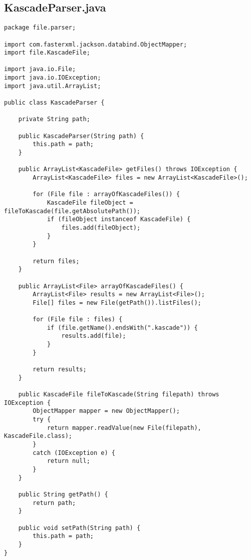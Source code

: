 \documentclass{acm_proc_article-sp}
\begin{document}
\subsection{KascadeParser.java}
\begin{lstlisting}
package file.parser;

import com.fasterxml.jackson.databind.ObjectMapper;
import file.KascadeFile;

import java.io.File;
import java.io.IOException;
import java.util.ArrayList;

public class KascadeParser {

    private String path;

    public KascadeParser(String path) {
        this.path = path;
    }

    public ArrayList<KascadeFile> getFiles() throws IOException {
        ArrayList<KascadeFile> files = new ArrayList<KascadeFile>();

        for (File file : arrayOfKascadeFiles()) {
            KascadeFile fileObject = fileToKascade(file.getAbsolutePath());
            if (fileObject instanceof KascadeFile) {
                files.add(fileObject);
            }
        }

        return files;
    }

    public ArrayList<File> arrayOfKascadeFiles() {
        ArrayList<File> results = new ArrayList<File>();
        File[] files = new File(getPath()).listFiles();

        for (File file : files) {
            if (file.getName().endsWith(".kascade")) {
                results.add(file);
            }
        }

        return results;
    }

    public KascadeFile fileToKascade(String filepath) throws IOException {
        ObjectMapper mapper = new ObjectMapper();
        try {
            return mapper.readValue(new File(filepath), KascadeFile.class);
        }
        catch (IOException e) {
            return null;
        }
    }

    public String getPath() {
        return path;
    }

    public void setPath(String path) {
        this.path = path;
    }
}
\end{lstlisting}
\end{document}
